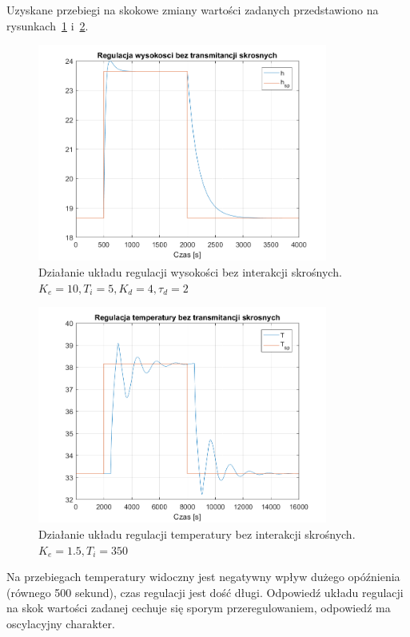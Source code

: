 \documentclass{article}
\begin{document}
Uzyskane przebiegi na skokowe zmiany wartości zadanych przedstawiono na rysunkach~\ref{fig::pid_h_nodec_nocross} i~\ref{fig::pid_T_nodec_nocross}.
\begin{figure}[htb]
	\centering
	\includegraphics[width=0.85\textwidth]{pid_h_nodec_nocross.PNG}
	\caption{Działanie układu regulacji wysokości bez interakcji skrośnych. $K_e = 10, T_i = 5, K_d=4, \tau_d=2$}
	\label{fig::pid_h_nodec_nocross}
\end{figure}
\begin{figure}[htb]
	\centering
	\includegraphics[width=0.85\textwidth]{pid_T_nodec_nocross.PNG}
	\caption{Działanie układu regulacji temperatury bez interakcji skrośnych. $K_e = 1.5, T_i = 350$}
	\label{fig::pid_T_nodec_nocross}
\end{figure}

Na przebiegach temperatury widoczny jest negatywny wpływ dużego opóźnienia (równego 500 sekund), czas regulacji jest dość długi. Odpowiedź układu regulacji na skok wartości zadanej cechuje się sporym przeregulowaniem, odpowiedź ma oscylacyjny charakter.
\end{document}
